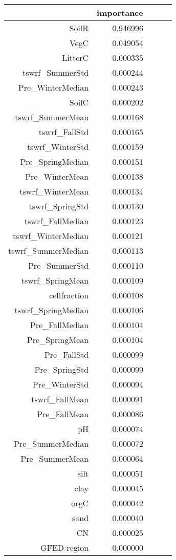 \begin{tabular}{rrrrr}
\toprule
 & importance \\
\midrule
SoilR & 0.946996 \\
VegC & 0.049054 \\
LitterC & 0.000335 \\
tswrf_SummerStd & 0.000244 \\
Pre_WinterMedian & 0.000243 \\
SoilC & 0.000202 \\
tswrf_SummerMean & 0.000168 \\
tswrf_FallStd & 0.000165 \\
tswrf_WinterStd & 0.000159 \\
Pre_SpringMedian & 0.000151 \\
Pre_WinterMean & 0.000138 \\
tswrf_WinterMean & 0.000134 \\
tswrf_SpringStd & 0.000130 \\
tswrf_FallMedian & 0.000123 \\
tswrf_WinterMedian & 0.000121 \\
tswrf_SummerMedian & 0.000113 \\
Pre_SummerStd & 0.000110 \\
tswrf_SpringMean & 0.000109 \\
cellfraction & 0.000108 \\
tswrf_SpringMedian & 0.000106 \\
Pre_FallMedian & 0.000104 \\
Pre_SpringMean & 0.000104 \\
Pre_FallStd & 0.000099 \\
Pre_SpringStd & 0.000099 \\
Pre_WinterStd & 0.000094 \\
tswrf_FallMean & 0.000091 \\
Pre_FallMean & 0.000086 \\
pH & 0.000074 \\
Pre_SummerMedian & 0.000072 \\
Pre_SummerMean & 0.000064 \\
silt & 0.000051 \\
clay & 0.000045 \\
orgC & 0.000042 \\
sand & 0.000040 \\
CN & 0.000025 \\
GFED-region & 0.000000 \\
\bottomrule
\end{tabular}
